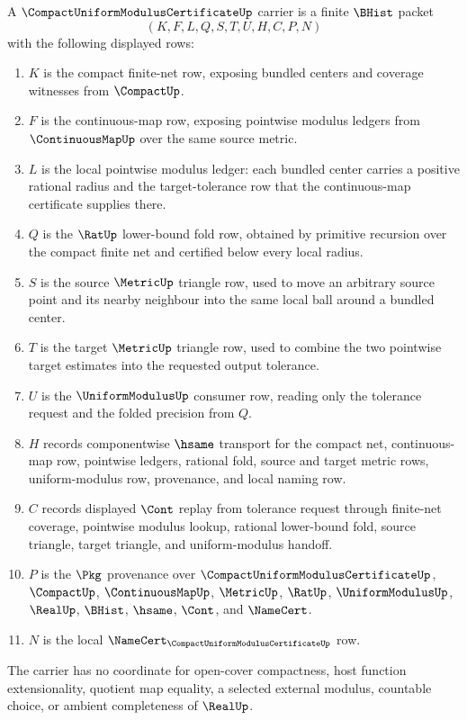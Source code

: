 \begin{definition}
\label{def:compact-modulus-fan-carrier}
A $\CompactUniformModulusCertificateUp$ carrier is a finite $\BHist$ packet
$$
(K,F,L,Q,S,T,U,H,C,P,N)
$$
with the following displayed rows:
\begin{enumerate}
\item $K$ is the compact finite-net row, exposing bundled centers and coverage witnesses from $\CompactUp$.
\item $F$ is the continuous-map row, exposing pointwise modulus ledgers from $\ContinuousMapUp$ over the same source metric.
\item $L$ is the local pointwise modulus ledger: each bundled center carries a positive rational radius and the target-tolerance row that the continuous-map certificate supplies there.
\item $Q$ is the $\RatUp$ lower-bound fold row, obtained by primitive recursion over the compact finite net and certified below every local radius.
\item $S$ is the source $\MetricUp$ triangle row, used to move an arbitrary source point and its nearby neighbour into the same local ball around a bundled center.
\item $T$ is the target $\MetricUp$ triangle row, used to combine the two pointwise target estimates into the requested output tolerance.
\item $U$ is the $\UniformModulusUp$ consumer row, reading only the tolerance request and the folded precision from $Q$.
\item $H$ records componentwise $\hsame$ transport for the compact net, continuous-map row, pointwise ledgers, rational fold, source and target metric rows, uniform-modulus row, provenance, and local naming row.
\item $C$ records displayed $\Cont$ replay from tolerance request through finite-net coverage, pointwise modulus lookup, rational lower-bound fold, source triangle, target triangle, and uniform-modulus handoff.
\item $P$ is the $\Pkg$ provenance over $\CompactUniformModulusCertificateUp$, $\CompactUp$, $\ContinuousMapUp$, $\MetricUp$, $\RatUp$, $\UniformModulusUp$, $\RealUp$, $\BHist$, $\hsame$, $\Cont$, and $\NameCert$.
\item $N$ is the local $\NameCert_{\CompactUniformModulusCertificateUp}$ row.
\end{enumerate}
The carrier has no coordinate for open-cover compactness, host function extensionality, quotient map equality, a selected external modulus, countable choice, or ambient completeness of $\RealUp$.
\end{definition}

